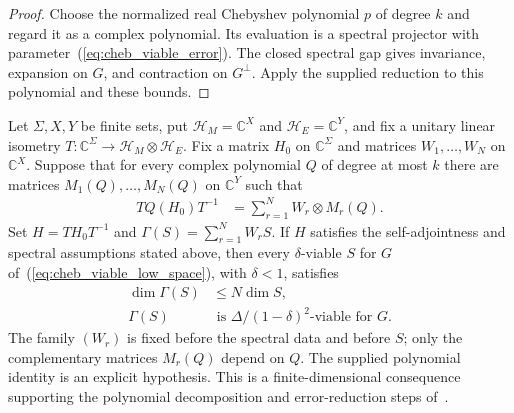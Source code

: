 \begin{proof}\leanok
    Choose the normalized real Chebyshev polynomial $p$ of degree $k$ and
    regard it as a complex polynomial. Its evaluation is a spectral
    projector with parameter~(\ref{eq:cheb_viable_error}). The closed spectral
    gap gives invariance, expansion on $G$, and contraction on $G^\perp$.
    Apply the supplied reduction to this polynomial and these bounds.
\end{proof}

\begin{theorem}
    \label{thm:matrix_family_chebyshev_viability}
    \leanok
    Let $\Sigma,X,Y$ be finite sets, put $\mathcal H_M=\mathbb C^X$ and
    $\mathcal H_E=\mathbb C^Y$, and fix a unitary linear isometry
    $T:\mathbb C^\Sigma\longrightarrow\mathcal H_M\otimes\mathcal H_E$.
    Fix a matrix $H_0$ on $\mathbb C^\Sigma$ and matrices
    $W_1,\ldots,W_N$ on $\mathbb C^X$. Suppose that for every complex
    polynomial $Q$ of degree at most $k$ there are matrices
    $M_1(Q),\ldots,M_N(Q)$ on $\mathbb C^Y$ such that
    \begin{align}
        TQ(H_0)T^{-1} & =\sum_{r=1}^N W_r\otimes M_r(Q).
        \label{eq:cheb_viable_family}
    \end{align}
    Set $H=TH_0T^{-1}$ and $\Gamma(S)=\sum_{r=1}^N W_rS$.
    If $H$ satisfies the self-adjointness and spectral assumptions stated
    above, then every $\delta$-viable $S$ for
    $G$ of~(\ref{eq:cheb_viable_low_space}), with $\delta<1$, satisfies
    \begin{align}
        \dim\Gamma(S) & \le N\dim S,
        \label{eq:cheb_viable_dimension}                                    \\
        \Gamma(S)     & \text{ is }\Delta/(1-\delta)^2\text{-viable for }G.
        \label{eq:cheb_viable_conclusion}
    \end{align}
    The family $(W_r)$ is fixed before the spectral data and before $S$;
    only the complementary matrices $M_r(Q)$ depend on $Q$.
    The supplied polynomial identity is an explicit hypothesis. This is a
    finite-dimensional consequence supporting the polynomial decomposition
    and error-reduction steps of~\cite[Proposition 5.7 and Lemma 2.9]{Arad2016RigorousRG}.
\end{theorem}

